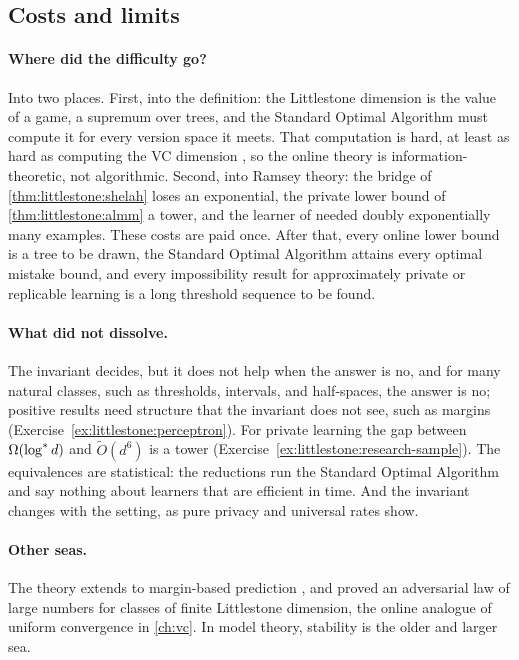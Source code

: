 \begin{refsection}
\section{Costs and limits}\label{sec:littlestone:costs}

\paragraph{Where did the difficulty go?} Into two places. First, into the definition: the Littlestone dimension is the value of a game, a supremum over trees, and the Standard Optimal Algorithm must compute it for every version space it meets. That computation is hard, at least as hard as computing the VC dimension \parencite{FrancesLitman1998}, so the online theory is information-theoretic, not algorithmic. Second, into Ramsey theory: the bridge of \cref{thm:littlestone:shelah} loses an exponential, the private lower bound of \cref{thm:littlestone:almm} a tower, and the learner of \textcite{BunLivniMoran2020} needed doubly exponentially many examples. These costs are paid once. After that, every online lower bound is a tree to be drawn, the Standard Optimal Algorithm attains every optimal mistake bound, and every impossibility result for approximately private or replicable learning is a long threshold sequence to be found.

\paragraph{What did not dissolve.} The invariant decides, but it does not help when the answer is no, and for many natural classes, such as thresholds, intervals, and half-spaces, the answer is no; positive results need structure that the invariant does not see, such as margins (Exercise~\ref{ex:littlestone:perceptron}). For private learning the gap between $\Omega(\log^{*} d)$ and $\tilde O(d^6)$ is a tower (Exercise~\ref{ex:littlestone:research-sample}). The equivalences are statistical: the reductions run the Standard Optimal Algorithm and say nothing about learners that are efficient in time. And the invariant changes with the setting, as pure privacy and universal rates show.

\paragraph{Other seas.} The theory extends to margin-based prediction \parencite{BenDavidPalShalevShwartz2009}, and \textcite{AlonEtAl2021} proved an adversarial law of large numbers for classes of finite Littlestone dimension, the online analogue of uniform convergence in \cref{ch:vc}. In model theory, stability is the older and larger sea.


\end{refsection}
